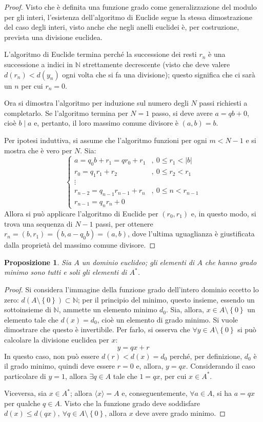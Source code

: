 \documentclass[11pt]{article}
\theoremstyle{style}
\newtheorem{prop}{Proposizione}[section]
\numberwithin{equation}{subsection}
\begin{document}
	\begin{proof}
		Visto che \`e definita una funzione grado come generalizzazione del modulo per gli interi, l'esistenza dell'algoritmo di Euclide segue la stessa dimostrazione del caso degli interi, visto anche che negli anelli euclidei \`e, per costruzione, prevista una divisione euclidea.

		L'algoritmo di Euclide termina perch\'e la successione dei resti $r_n$ \`e una successione a indici in $\mathbb{N}$ strettamente decrescente (visto che deve valere $d(r_n) < d(y_n)$ ogni volta che si fa una divisione); questo significa che ci sar\`a un $n$ per cui $r_n = 0$.

		Ora si dimostra l'algoritmo per induzione sul numero degli $N$ passi richiesti a completarlo.
		Se l'algoritmo termina per $N=1$ passo, si deve avere $a = qb + 0$, cio\`e $b \mid a$ e, pertanto, il loro massimo comune divisore \`e $(a,b) = b$.

		Per ipotesi induttiva, si assume che l'algoritmo funzioni per ogni $m < N-1$ e si mostra che \`e vero per $N$.
		Sia:
		\[
		\begin{cases}
			a = q_0b +r_1 = qr_0+r_1 &,\ 0\le r_1<\lvert b \rvert \\
			r_0 = q_1r_1 + r_2 &,\ 0\le r_2<r_1\\
			\vdots\\
			r_{n-2} =q_{n-1} r_{n-1} +r_n &,\ 0\le n < r_{n-1} \\
			r_{n-1} = q_nr_n + 0
		\end{cases}
		\] 
		Allora si pu\`o applicare l'algoritmo di Euclide per $(r_0,r_1)$ e, in questo modo, si trova una sequenza di $N-1$ passi, per ottenere $r _ n =(b,r_1)=(b,a-q_0b)=(a,b)$, dove l'ultima uguaglianza \`e giustificata dalla propriet\`a del massimo comune divisore.
	\end{proof}
\begin{prop}
	Sia $A$ un dominio euclideo; gli elementi di $A$ che hanno grado minimo sono tutti e soli gli elementi di $A^*$.
\end{prop}
	\begin{proof}
		Si considera l'immagine della funzione grado dell'intero dominio eccetto lo zero: $d ( A\setminus\left\{ 0 \right\} ) \subset \mathbb{N}$; per il principio del minimo, questo insieme, essendo un sottoinsieme di $\mathbb{N}$, ammette un elemento minimo $d_0$.
		Sia, allora, $x \in A\setminus\left\{ 0 \right\} $ un elemento tale che $d(x) = d_0$, cio\`e un elemento di grado minimo. 
		Si vuole dimostrare che questo \`e invertibile.
		Per farlo, si osserva che $\forall y \in A\setminus\left\{ 0 \right\} $ si pu\`o calcolare la divisione euclidea per $x$:
		\[
		 y = qx +r
		\] 
		In questo caso, non pu\`o essere $d(r) < d(x) = d_0$ perch\'e, per definizione, $d_0$ \`e il grado minimo, quindi deve essere $r= 0$ e, allora, $y= qx$.
		Considerando il caso particolare di $y = 1$, allora $\exists q \in A$ tale che $1 = qx$, per cui $x \in A^*$.

		Viceversa, sia $x \in A^*$; allora $\langle x \rangle = A$ e, conseguentemente, $\forall a \in A$, si ha $a=qx$ per qualche $ q \in A$.
		Visto che la funzione grado deve soddisfare $d(x) \le d(qx), \ \forall q \in A \setminus\left\{ 0 \right\} $, allora $x$ deve avere grado minimo.
	\end{proof}
\end{document}
